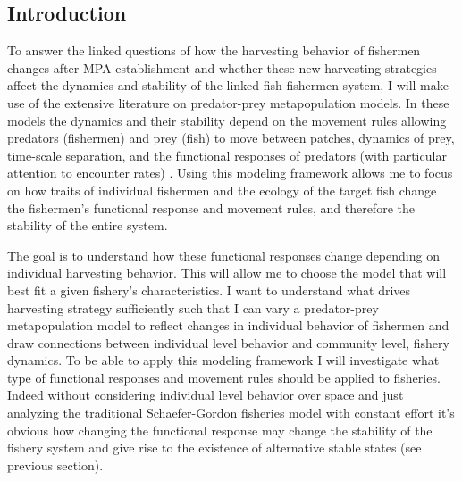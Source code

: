 \documentclass[12pt,a4paper]{report}
\begin{document}
\subsection{Introduction}
To answer the linked questions of how the harvesting behavior of fishermen changes after MPA establishment and whether these new harvesting strategies affect the dynamics and stability of the linked fish-fishermen system, I will make use of the extensive literature on predator-prey metapopulation models. In these models the dynamics and their stability depend on the movement rules allowing predators (fishermen) and prey (fish) to move between patches, dynamics of prey, time-scale separation, and the functional responses of predators (with particular attention to encounter rates) \citep{Bernsteinetal:1999}. Using this modeling framework allows me to focus on how traits of individual fishermen and the ecology of the target fish change the fishermen's functional response and movement rules, and therefore the stability of the entire system. 

The goal is to understand how these functional responses change depending on individual harvesting behavior. This will allow me to choose the model that will best fit a given fishery's characteristics. I want to understand what drives harvesting strategy sufficiently such that I can vary a predator-prey metapopulation model to reflect changes in individual behavior of fishermen and draw connections between individual level behavior and community level, fishery dynamics. To be able to apply this modeling framework I will investigate what type of functional responses and movement rules should be applied to fisheries. Indeed without considering individual level behavior over space and just analyzing the traditional Schaefer-Gordon fisheries model with constant effort it's obvious how changing the functional response may change the stability of the fishery system and give rise to the existence of alternative stable states (see previous section).
	
\end{document}
